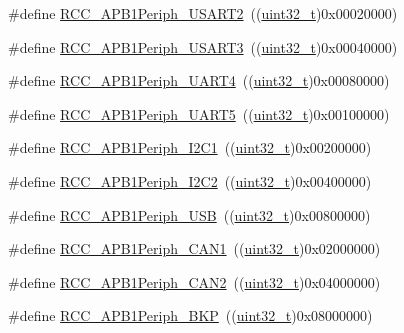 \begin{DoxyCompactItemize}
\item 
\#define \hyperlink{group___a_p_b1__peripheral_gaa69c77220b943a42a4bacb8a3bf87dd0}{R\+C\+C\+\_\+\+A\+P\+B1\+Periph\+\_\+\+U\+S\+A\+R\+T2}~((\hyperlink{_p_e___types_8h_a33594304e786b158f3fb30289278f5af}{uint32\+\_\+t})0x00020000)
\item 
\#define \hyperlink{group___a_p_b1__peripheral_gaf72838a63d7d6200f251c1eb334cbaac}{R\+C\+C\+\_\+\+A\+P\+B1\+Periph\+\_\+\+U\+S\+A\+R\+T3}~((\hyperlink{_p_e___types_8h_a33594304e786b158f3fb30289278f5af}{uint32\+\_\+t})0x00040000)
\item 
\#define \hyperlink{group___a_p_b1__peripheral_ga839d7ae3386622158210ecf53d9cd989}{R\+C\+C\+\_\+\+A\+P\+B1\+Periph\+\_\+\+U\+A\+R\+T4}~((\hyperlink{_p_e___types_8h_a33594304e786b158f3fb30289278f5af}{uint32\+\_\+t})0x00080000)
\item 
\#define \hyperlink{group___a_p_b1__peripheral_gaa00c73f88a7af45fb29df97b07acd856}{R\+C\+C\+\_\+\+A\+P\+B1\+Periph\+\_\+\+U\+A\+R\+T5}~((\hyperlink{_p_e___types_8h_a33594304e786b158f3fb30289278f5af}{uint32\+\_\+t})0x00100000)
\item 
\#define \hyperlink{group___a_p_b1__peripheral_ga594f87d504f7d63697d841033d1538f6}{R\+C\+C\+\_\+\+A\+P\+B1\+Periph\+\_\+\+I2\+C1}~((\hyperlink{_p_e___types_8h_a33594304e786b158f3fb30289278f5af}{uint32\+\_\+t})0x00200000)
\item 
\#define \hyperlink{group___a_p_b1__peripheral_ga8eaeded403b5a2277fbfb3896c639416}{R\+C\+C\+\_\+\+A\+P\+B1\+Periph\+\_\+\+I2\+C2}~((\hyperlink{_p_e___types_8h_a33594304e786b158f3fb30289278f5af}{uint32\+\_\+t})0x00400000)
\item 
\#define \hyperlink{group___a_p_b1__peripheral_ga69a1b3de9a59155bc8455eea5a15e3e4}{R\+C\+C\+\_\+\+A\+P\+B1\+Periph\+\_\+\+U\+SB}~((\hyperlink{_p_e___types_8h_a33594304e786b158f3fb30289278f5af}{uint32\+\_\+t})0x00800000)
\item 
\#define \hyperlink{group___a_p_b1__peripheral_ga7f1d940739de0134ae89e9e04214989d}{R\+C\+C\+\_\+\+A\+P\+B1\+Periph\+\_\+\+C\+A\+N1}~((\hyperlink{_p_e___types_8h_a33594304e786b158f3fb30289278f5af}{uint32\+\_\+t})0x02000000)
\item 
\#define \hyperlink{group___a_p_b1__peripheral_ga62801597b97816751c038acb1466179c}{R\+C\+C\+\_\+\+A\+P\+B1\+Periph\+\_\+\+C\+A\+N2}~((\hyperlink{_p_e___types_8h_a33594304e786b158f3fb30289278f5af}{uint32\+\_\+t})0x04000000)
\item 
\#define \hyperlink{group___a_p_b1__peripheral_ga2a26b65d0e38030e414a9d39276645b1}{R\+C\+C\+\_\+\+A\+P\+B1\+Periph\+\_\+\+B\+KP}~((\hyperlink{_p_e___types_8h_a33594304e786b158f3fb30289278f5af}{uint32\+\_\+t})0x08000000)

\end{DoxyCompactItemize}
